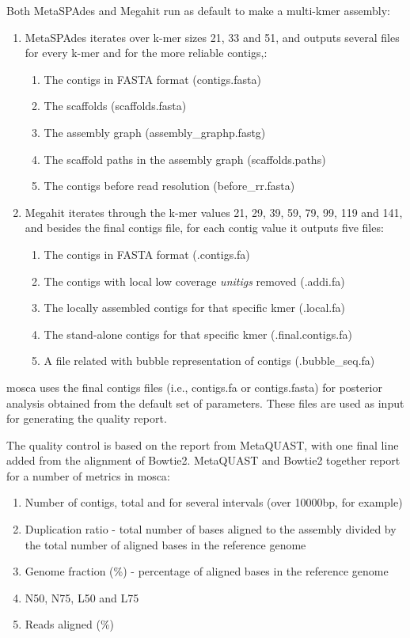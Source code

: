 \documentclass[
  oneside,
  11pt, a4paper,
  footinclude=true,
  headinclude=true,
  cleardoublepage=empty
]{scrbook}
\begin{document}
    Both MetaSPAdes and Megahit run as default to make a multi-kmer assembly: 
    \begin{enumerate}
        \item MetaSPAdes iterates over k-mer sizes 21, 33 and 51, and outputs several files for every k-mer and for the more reliable contigs,:
        \begin{enumerate}
            \item The contigs in FASTA format (contigs.fasta)
            \item The scaffolds (scaffolds.fasta)
            \item The assembly graph (assembly\_graphp.fastg)
            \item The scaffold paths in the assembly graph (scaffolds.paths)
            \item The contigs before read resolution (before\_rr.fasta)
        \end{enumerate}
        \item Megahit iterates through the k-mer values 21, 29, 39, 59, 79, 99, 119 and 141, and besides the final contigs file, for each contig value it outputs five files:
        \begin{enumerate}
            \item The contigs in FASTA format (.contigs.fa)
            \item The contigs with local low coverage \textit{unitigs} removed (.addi.fa)
            \item The locally assembled contigs for that specific kmer (.local.fa)
            \item The stand-alone contigs for that specific kmer (.final.contigs.fa)
            \item A file related with bubble representation of contigs (.bubble\_seq.fa)
        \end{enumerate}
    \end{enumerate}
    
    \gls{mosca} uses the final contigs files (i.e., contigs.fa or contigs.fasta) for posterior analysis obtained from the default set of parameters. These files are used as input for generating the quality report.
    
    The quality control is based on the report from MetaQUAST, with one final line added from the alignment of Bowtie2. MetaQUAST and Bowtie2 together report for a number of metrics in \gls{mosca}:
    \begin{enumerate}
        \item Number of contigs, total and for several intervals (over 10000\gls{bp}, for example)
        \item Duplication ratio - total number of bases aligned to the assembly divided by the total number of aligned bases in the reference genome
        \item Genome fraction (\%) - percentage of aligned bases in the reference genome
        \item N50, N75, L50 and L75
        \item Reads aligned (\%)
    \end{enumerate}
    
\end{document}
